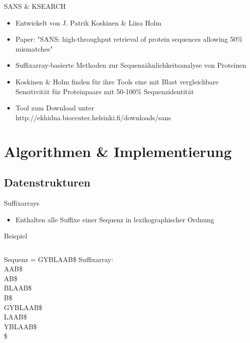 \documentclass[xcolor=dvipsnames, aspectratio=1610]{beamer}
\begin{document}
\begin{frame}{SANS \& KSEARCH}
  \begin{itemize}
    \item Entwickelt von J. Patrik Koskinen \& Liisa Holm
    \item Paper: "SANS: high-throughput retrieval of protein sequences allowing 50\% mismatches" 
    \item Suffixarray-basierte Methoden zur Sequenzähnlichkeitsanalyse von Proteinen
    \item Koskinen \& Holm finden für ihre Tools eine mit Blast vergleichbare Sensitivität für Proteinpaare mit 50-100\% Sequenzidentität
    \item Tool zum Download unter http://ekhidna.biocenter.helsinki.fi/downloads/sans 
  \end{itemize}
\end{frame}

\section{Algorithmen \& Implementierung}

\subsection{Datenstrukturen}

\begin{frame}{Suffixarrays}
  \begin{itemize}
    \item Enthalten alle Suffixe einer Sequenz in lexikographischer Ordnung
  \end{itemize}
  \begin{block}{Beispiel}
    \begin{columns}
        Sequenz = GYBLAAB\$
      \scriptsize{}
        Suffixarray:\\
        AAB\$\\
        AB\$\\
        BLAAB\$\\
        B\$\\
        GYBLAAB\$\\
        LAAB\$\\
        YBLAAB\$\\
        \$\\
      \normalsize
    \end{columns}
  \end{block}
\end{frame}
\end{document}
